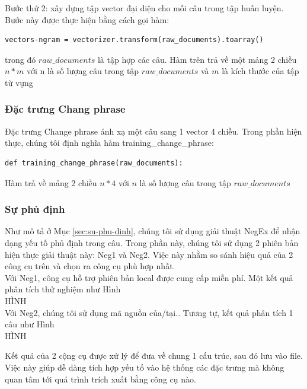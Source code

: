 Bước thứ 2: xây dựng tập vector đại diện cho mỗi câu trong tập huấn luyện. Bước này được thực hiện bằng cách gọi hàm:
\begin{lstlisting}
vectors-ngram = vectorizer.transform(raw_documents).toarray()
\end{lstlisting}
trong đó $raw\_documents$ là tập hợp các câu. Hàm trên trả về một mảng 2 chiều $n*m$ với n là số lượng câu trong tập $raw\_documents$ và $m$ là kích thước của tập từ vựng
\subsubsection*{Đặc trưng Chang phrase}
Đặc trưng Change phrase ánh xạ một câu sang 1 vector 4 chiều. Trong phần hiện thực, chúng tôi định nghĩa hàm training\_change\_phrase:
\begin{lstlisting}
def training_change_phrase(raw_documents):
\end{lstlisting}
Hàm trả về mảng 2 chiều $n*4$ với $n$ là số lượng câu trong tập $raw\_documents$

\subsubsection*{Sự phủ định}
Như mô tả ở Mục \ref{sec:su-phu-dinh}, chúng tôi sử dụng giải thuật NegEx để nhận dạng yếu tố phủ định trong câu. Trong phần này, chúng tôi sử dụng 2 phiên bản hiện thực giải thuật này: Neg1 và Neg2. Việc này nhằm so sánh hiệu quả của 2 công cụ trên và chọn ra công cụ phù hợp nhất.\\

Với Neg1, công cụ hỗ trợ phiên bản local được cung cấp miễn phí. Một kết quả phân tích thử nghiệm như Hình\\
HÌNH\\

Với Neg2, chúng tôi sử dụng mã nguồn của/tại.. Tương tự, kết quả phân tích 1 câu như Hình \\
HÌNH

Kết quả của 2 cộng cụ được xử lý để đưa về chung 1 cấu trúc, sau đó lưu vào file. Việc này giúp dễ dàng tích hợp yếu tố vào hệ thống các đặc trưng mà không quan tâm tới quá trình trích xuất bằng công cụ nào.

